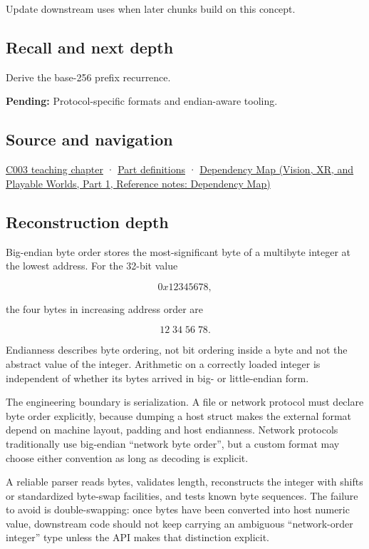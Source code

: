\hypertarget{appendix-92e040df969a-used-by}{}

Update downstream uses when later chunks build on this concept.

\subsection{Recall and next depth}\label{appendix-92e040df969a-recall-and-next-depth}

\hypertarget{appendix-92e040df969a-recall-and-next-depth}{}

Derive the base-256 prefix recurrence.

\textbf{Pending:} Protocol-specific formats and endian-aware tooling.

\subsection{Source and navigation}\label{appendix-92e040df969a-source-and-navigation}

\hypertarget{appendix-92e040df969a-source-and-navigation}{}

\hyperref[01-foundations-i-ch002-where-the-bytes-live]{C003 teaching chapter} · \hyperref[appendix-fd090d982a15-m003---parts-41-60]{Part definitions} · \href{../07-Vision-XR-and-Playable-Worlds-P01/main.pdf\#nameddest=appendix-4ad47bdd269a}{Dependency Map (Vision, XR, and Playable Worlds, Part 1, Reference notes: Dependency Map)}

\subsection{Reconstruction depth}\label{appendix-92e040df969a-reconstruction-depth}

\hypertarget{appendix-92e040df969a-reconstruction-depth}{}

Big-endian byte order stores the most-significant byte of a multibyte integer at the lowest address. For the 32-bit value

\[
0x12345678,
\]

the four bytes in increasing address order are

\[
12\;34\;56\;78.
\]

Endianness describes byte ordering, not bit ordering inside a byte and not the abstract value of the integer. Arithmetic on a correctly loaded integer is independent of whether its bytes arrived in big- or little-endian form.

The engineering boundary is serialization. A file or network protocol must declare byte order explicitly, because dumping a host struct makes the external format depend on machine layout, padding and host endianness. Network protocols traditionally use big-endian ``network byte order'', but a custom format may choose either convention as long as decoding is explicit.

A reliable parser reads bytes, validates length, reconstructs the integer with shifts or standardized byte-swap facilities, and tests known byte sequences. The failure to avoid is double-swapping: once bytes have been converted into host numeric value, downstream code should not keep carrying an ambiguous ``network-order integer'' type unless the API makes that distinction explicit.
